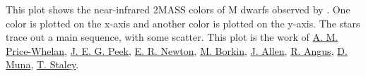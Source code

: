 This plot shows the near-infrared 2MASS colors of M dwarfs observed by \cite{http://adsabs.harvard.edu/abs/2014AJ....147...20N}. One color is plotted on the x-axis and another color is plotted on the y-axis. The stars trace out a main sequence, with some scatter. This plot is the work of \href{http://adrian.pw}{A. M. Price-Whelan}, \href{http://www.astro.columbia.edu/~jpeek/}{J. E. G. Peek}, \href{https://www.cfa.harvard.edu/~enewton/}{E. R. Newton}, \href{http://people.seas.harvard.edu/~borkin/}{M. Borkin}, \href{http://www.physics.usyd.edu.au/~jallen/}{J. Allen}, \href{http://www.ruthangus.co.uk/}{R. Angus}, \href{}{D. Muna}, \href{http://www.ast.cam.ac.uk/~ts337/}{T. Staley}. 